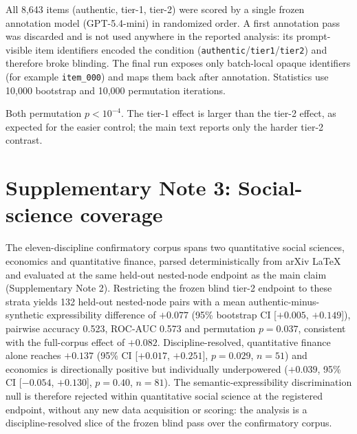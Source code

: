 \documentclass[11pt,a4paper]{article}
\newcommand{\snote}[1]{\section*{Supplementary Note #1}}
\begin{document}
All 8,643 items (authentic, tier-1, tier-2) were scored by a single frozen annotation model (GPT-5.4-mini) in randomized order. A first annotation pass was discarded and is not used anywhere in the reported analysis: its prompt-visible item identifiers encoded the condition (\texttt{authentic}/\texttt{tier1}/\texttt{tier2}) and therefore broke blinding. The final run exposes only batch-local opaque identifiers (for example \texttt{item\_000}) and maps them back after annotation. Statistics use 10,000 bootstrap and 10,000 permutation iterations.

\begin{table}[h]
\caption*{\textbf{Supplementary Table 1.} Authentic-versus-synthetic expressibility discrimination (2,881 pairs per tier).}
\centering
\footnotesize
\setlength{\tabcolsep}{4pt}
\end{table}

Both permutation $p<10^{-4}$. The tier-1 effect is larger than the tier-2 effect, as expected for the easier control; the main text reports only the harder tier-2 contrast.

\snote{3: Social-science coverage}

The eleven-discipline confirmatory corpus spans two quantitative social sciences, economics and quantitative finance, parsed deterministically from arXiv LaTeX and evaluated at the same held-out nested-node endpoint as the main claim (Supplementary Note 2). Restricting the frozen blind tier-2 endpoint to these strata yields 132 held-out nested-node pairs with a mean authentic-minus-synthetic expressibility difference of $+0.077$ (95\% bootstrap CI [$+0.005$, $+0.149$]), pairwise accuracy 0.523, ROC-AUC 0.573 and permutation $p=0.037$, consistent with the full-corpus effect of $+0.082$. Discipline-resolved, quantitative finance alone reaches $+0.137$ (95\% CI [$+0.017$, $+0.251$], $p=0.029$, $n=51$) and economics is directionally positive but individually underpowered ($+0.039$, 95\% CI [$-0.054$, $+0.130$], $p=0.40$, $n=81$). The semantic-expressibility discrimination null is therefore rejected within quantitative social science at the registered endpoint, without any new data acquisition or scoring: the analysis is a discipline-resolved slice of the frozen blind pass over the confirmatory corpus.
\end{document}
